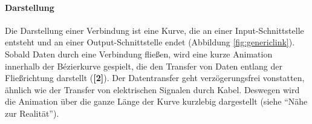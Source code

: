 \paragraph{Darstellung} Die Darstellung einer Verbindung ist eine Kurve, die an einer Input-Schnittstelle entsteht und an einer Output-Schnittstelle endet (Abbildung \ref{fig:genericlink}). Sobald Daten durch eine Verbindung fließen, wird eine kurze Animation innerhalb der Bézierkurve gespielt, die den Transfer von Daten entlang der Fließrichtung darstellt (\textbf{[2]}). Der Datentransfer geht verzögerungsfrei vonstatten, ähnlich wie der Transfer von elektrischen Signalen durch Kabel. Deswegen wird die Animation über die ganze Länge der Kurve kurzlebig dargestellt (siehe "`Nähe zur Realität"').


